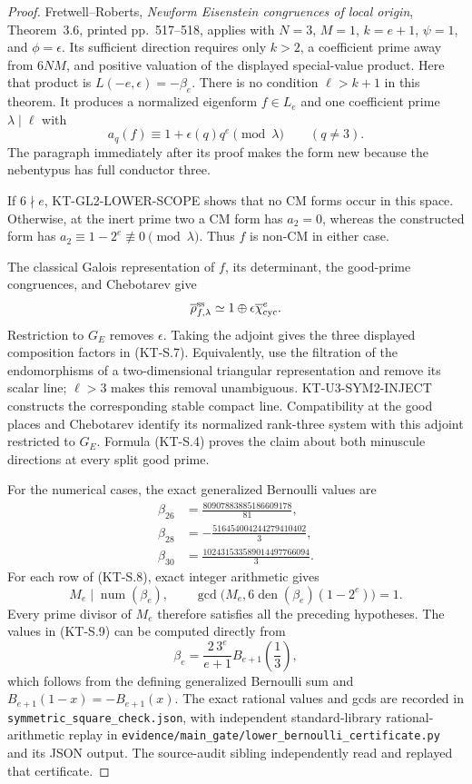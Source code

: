 \begin{proof}
Fretwell--Roberts, \emph{Newform Eisenstein congruences of
local origin}, Theorem~3.6, printed pp.~517--518, applies
with $N=3$, $M=1$, $k=e+1$, $\psi=1$, and
$\phi=\epsilon$.  Its sufficient direction requires only
$k>2$, a coefficient prime away from $6NM$, and positive
valuation of the displayed special-value product.
Here that product is $L(-e,\epsilon)=-\beta_e$.
There is no condition $\ell>k+1$ in this theorem.
It produces a normalized eigenform $f\in L_e$ and one
coefficient prime $\lambda\mid\ell$ with
\[
     a_q(f)\equiv1+\epsilon(q)q^e\pmod\lambda
                 \qquad(q\ne3).
\]
The paragraph immediately after its proof makes the form new
because the nebentypus has full conductor three.

If $6\nmid e$, KT-GL2-LOWER-SCOPE shows that no CM forms
occur in this space.  Otherwise, at the inert prime two a CM
form has $a_2=0$, whereas the constructed form has
$a_2\equiv1-2^e\not\equiv0\pmod\lambda$.
Thus $f$ is non-CM in either case.

The classical Galois representation of $f$, its determinant,
the good-prime congruences, and Chebotarev give
\[
     \overline\rho_{f,\lambda}^{\rm ss}
       \simeq1\oplus\epsilon\overline\chi_{\rm cyc}^{e}.
\]
Restriction to $G_E$ removes $\epsilon$.
Taking the adjoint gives the three displayed composition
factors in (KT-S.7).  Equivalently, use the filtration of the
endomorphisms of a two-dimensional triangular representation
and remove its scalar line; $\ell>3$ makes this removal
unambiguous.  KT-U3-SYM2-INJECT constructs the corresponding
stable compact line.  Compatibility at the good places and
Chebotarev identify its normalized rank-three system with this
adjoint restricted to $G_E$.  Formula (KT-S.4) proves the
claim about both minuscule directions at every split good
prime.

For the numerical cases, the exact generalized Bernoulli
values are
\[
 \begin{aligned}
 \beta_{26}&=\frac{80907883885186609178}{81},\\
 \beta_{28}&=-\frac{516454004244279410402}{3},\\
 \beta_{30}&=\frac{102431533589014497766094}{3}.
 \end{aligned}                                                \tag{KT-S.9}
\]
For each row of (KT-S.8), exact integer arithmetic gives
\[
 M_e\mid\operatorname{num}(\beta_e),\qquad
 \gcd\bigl(M_e,6\operatorname{den}(\beta_e)(1-2^e)\bigr)=1.
\]
Every prime divisor of $M_e$ therefore satisfies all the
preceding hypotheses.  The values in (KT-S.9) can be computed
directly from
\[
 \beta_e=\frac{2\,3^e}{e+1}
                 B_{e+1}\!\left(\frac13\right),
\]
which follows from the defining generalized Bernoulli sum
and $B_{e+1}(1-x)=-B_{e+1}(x)$.
The exact rational values and gcds are recorded in
\texttt{symmetric\_square\_check.json}, with independent
standard-library rational-arithmetic replay in
\texttt{evidence/main\_gate/lower\_bernoulli\_certificate.py}
and its JSON output.  The source-audit sibling independently
read and replayed that certificate.
\end{proof}

